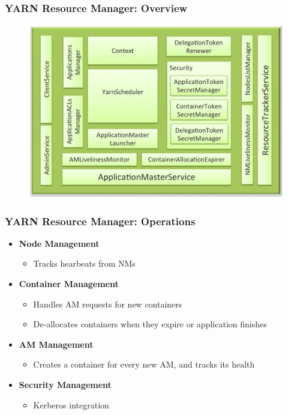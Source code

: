 \begin{frame}
\frametitle{YARN Resource Manager: Overview}
  \begin{figure}[h]
    \centering
    \includegraphics[scale=0.25]{./figures/yarn_RM}
    \label{fig:yarn_RM}
  \end{figure}
\end{frame}

\begin{frame}
\frametitle{YARN Resource Manager: Operations}
\begin{itemize}
  \item {\bf Node Management}
  \begin{itemize}
    \item Tracks hearbeats from NMs
  \end{itemize}

\vspace{20pt}

  \item {\bf Container Management}
  \begin{itemize}
    \item Handles AM requests for new containers
    \item De-allocates containers when they expire or application finishes
  \end{itemize}

\vspace{20pt}

  \item {\bf AM Management}
  \begin{itemize}
    \item Creates a container for every new AM, and tracks its health
  \end{itemize}

\vspace{20pt}

  \item {\bf Security Management}
  \begin{itemize}
    \item Kerberos integration
  \end{itemize}
\end{itemize}
\end{frame}

